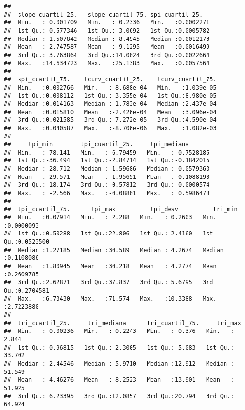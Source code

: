 \documentclass[11pt,]{article}
\begin{document}
\begin{verbatim}
##                                                                     
##  slope_cuartil_25.   slope_cuartil_75. spi_cuartil_25.    
##  Min.   : 0.001709   Min.   : 0.2336   Min.   :0.0002271  
##  1st Qu.: 0.577346   1st Qu.: 3.0692   1st Qu.:0.0005782  
##  Median : 1.507842   Median : 8.4945   Median :0.0012173  
##  Mean   : 2.747587   Mean   : 9.1295   Mean   :0.0016499  
##  3rd Qu.: 3.763864   3rd Qu.:14.0024   3rd Qu.:0.0022664  
##  Max.   :14.634723   Max.   :25.1383   Max.   :0.0057564  
##                                                           
##  spi_cuartil_75.    tcurv_cuartil_25.    tcurv_cuartil_75.  
##  Min.   :0.002766   Min.   :-8.688e-04   Min.   :1.039e-05  
##  1st Qu.:0.008112   1st Qu.:-3.355e-04   1st Qu.:8.980e-05  
##  Median :0.014163   Median :-1.783e-04   Median :2.437e-04  
##  Mean   :0.015810   Mean   :-2.426e-04   Mean   :3.096e-04  
##  3rd Qu.:0.021585   3rd Qu.:-7.272e-05   3rd Qu.:4.590e-04  
##  Max.   :0.040587   Max.   :-8.706e-06   Max.   :1.082e-03  
##                                                             
##     tpi_min        tpi_cuartil_25.     tpi_mediana        
##  Min.   :-78.141   Min.   :-6.79459   Min.   :-0.7528185  
##  1st Qu.:-36.494   1st Qu.:-2.84714   1st Qu.:-0.1842015  
##  Median :-28.712   Median :-1.59686   Median :-0.0579363  
##  Mean   :-29.571   Mean   :-1.95651   Mean   :-0.1088190  
##  3rd Qu.:-18.174   3rd Qu.:-0.57812   3rd Qu.:-0.0000574  
##  Max.   : -2.566   Max.   :-0.08801   Max.   : 0.5986478  
##                                                           
##  tpi_cuartil_75.      tpi_max          tpi_desv          tri_min         
##  Min.   :0.07914   Min.   : 2.288   Min.   : 0.2603   Min.   :0.0000093  
##  1st Qu.:0.50288   1st Qu.:22.806   1st Qu.: 2.4160   1st Qu.:0.0523500  
##  Median :1.27185   Median :30.589   Median : 4.2674   Median :0.1108086  
##  Mean   :1.80945   Mean   :30.218   Mean   : 4.2774   Mean   :0.2609785  
##  3rd Qu.:2.62871   3rd Qu.:37.837   3rd Qu.: 5.6795   3rd Qu.:0.2704581  
##  Max.   :6.73430   Max.   :71.574   Max.   :10.3388   Max.   :2.7223880  
##                                                                          
##  tri_cuartil_25.     tri_mediana      tri_cuartil_75.     tri_max       
##  Min.   : 0.00236   Min.   : 0.2243   Min.   : 0.376   Min.   :  2.844  
##  1st Qu.: 0.96815   1st Qu.: 2.3005   1st Qu.: 5.083   1st Qu.: 33.702  
##  Median : 2.44546   Median : 5.9710   Median :12.912   Median : 51.549  
##  Mean   : 4.46276   Mean   : 8.2523   Mean   :13.901   Mean   : 51.925  
##  3rd Qu.: 6.23395   3rd Qu.:12.0857   3rd Qu.:20.794   3rd Qu.: 64.924  

\end{verbatim}
\end{document}
